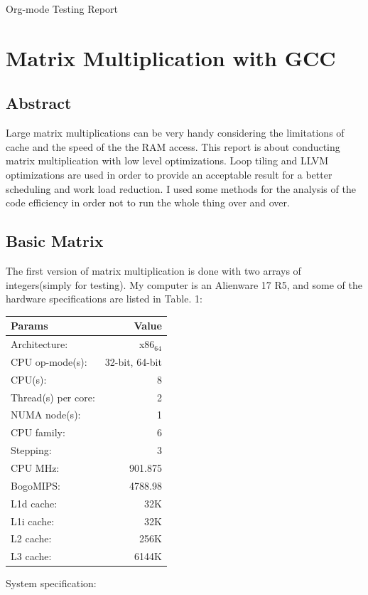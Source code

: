 \documentclass[11pt]{article}
\author{潘安}
\date{\today}
\title{}
\begin{document}
\tableofcontents

Org-mode Testing Report
\section{Matrix Multiplication with GCC}
\label{sec:orgheadline7}

\subsection{Abstract}
\label{sec:orgheadline1}
Large matrix multiplications can be very handy considering 
the limitations of cache and the speed of the the RAM access.
This report is about conducting matrix multiplication with 
low level optimizations. Loop tiling and LLVM optimizations
are used in order to provide an acceptable result for a better
scheduling and work load reduction. I used some methods for 
the analysis of the code efficiency in order not to run the whole thing
over and over. 

\subsection{Basic Matrix}
\label{sec:orgheadline4}
The first version of matrix multiplication is done with
 two arrays of integers(simply for testing). My computer is 
an Alienware 17 R5, and some of the hardware specifications are listed
in Table. 1:


\begin{center}
\begin{tabular}{lr}
\hline
\hline
Params & Value\\
\hline
Architecture: & x86\(_{\text{64}}\)\\
CPU op-mode(s): & 32-bit, 64-bit\\
CPU(s): & 8\\
Thread(s) per core: & 2\\
NUMA node(s): & 1\\
CPU family: & 6\\
Stepping: & 3\\
CPU MHz: & 901.875\\
BogoMIPS: & 4788.98\\
L1d cache: & 32K\\
L1i cache: & 32K\\
L2 cache: & 256K\\
L3 cache: & 6144K\\
\hline
\end{tabular}
\end{center}
System specification:
\end{document}
